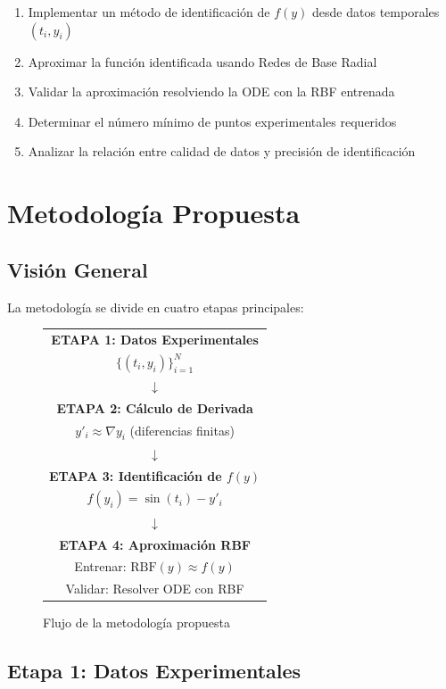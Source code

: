 \documentclass[11pt,a4paper]{article}
\begin{document}
\begin{enumerate}
    \item Implementar un método de identificación de $f(y)$ desde datos temporales $(t_i, y_i)$
    \item Aproximar la función identificada usando Redes de Base Radial
    \item Validar la aproximación resolviendo la ODE con la RBF entrenada
    \item Determinar el número mínimo de puntos experimentales requeridos
    \item Analizar la relación entre calidad de datos y precisión de identificación
\end{enumerate}

\section{Metodología Propuesta}

\subsection{Visión General}

La metodología se divide en cuatro etapas principales:

\begin{figure}[H]
\centering
\begin{tabular}{|c|}
\hline
\textbf{ETAPA 1: Datos Experimentales} \\
$\{(t_i, y_i)\}_{i=1}^{N}$ \\
\hline
$\downarrow$ \\
\hline
\textbf{ETAPA 2: Cálculo de Derivada} \\
$y'_i \approx \nabla y_i$ (diferencias finitas) \\
\hline
$\downarrow$ \\
\hline
\textbf{ETAPA 3: Identificación de $f(y)$} \\
$f(y_i) = \sin(t_i) - y'_i$ \\
\hline
$\downarrow$ \\
\hline
\textbf{ETAPA 4: Aproximación RBF} \\
Entrenar: $\text{RBF}(y) \approx f(y)$ \\
Validar: Resolver ODE con RBF \\
\hline
\end{tabular}
\caption{Flujo de la metodología propuesta}
\label{fig:methodology}
\end{figure}

\subsection{Etapa 1: Datos Experimentales}
\end{document}
